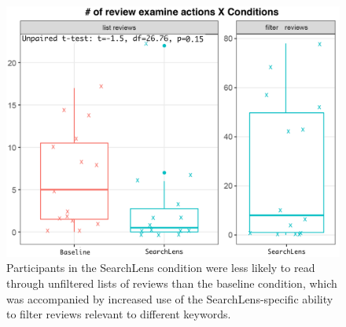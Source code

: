 \documentclass{sigchi}
\newcommand{\adam}[1]{{\textcolor{red}{Adam: #1}}}
\begin{document}







\begin{figure}[]
    \centering
    \includegraphics[height=0.6\columnwidth]{figures/reviews.png}
    \caption{Participants in the SearchLens condition were less likely to read through unfiltered lists of reviews than the baseline condition, which was accompanied by increased use of the SearchLens-specific ability to filter reviews relevant to different keywords.}
    \label{fig:reviews}
\end{figure}
\end{document}
